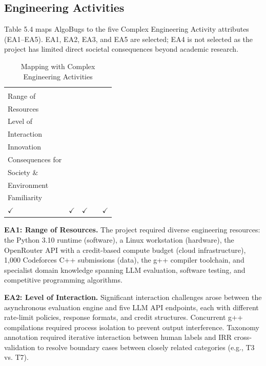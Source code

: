 \subsection{Engineering Activities}

Table 5.4 maps AlgoBugs to the five Complex Engineering Activity attributes (EA1--EA5). EA1, EA2, EA3, and EA5 are selected; EA4 is not selected as the project has limited direct societal consequences beyond academic research.

\begin{table}[h!]
    \centering
    \caption{Mapping with Complex Engineering Activities}
    \label{tab:ea_mapping}
    {\setlength{\tabcolsep}{3pt}\renewcommand{\arraystretch}{1.8}%
    \begin{tabularx}{\linewidth}{|>{\centering\arraybackslash}X|>{\centering\arraybackslash}X|>{\centering\arraybackslash}X|>{\centering\arraybackslash}X|>{\centering\arraybackslash}X|}
        \hline
        \makecell[c]{\textbf{EA1}\\\scriptsize Range of\\\scriptsize Resources} &
        \makecell[c]{\textbf{EA2}\\\scriptsize Level of\\\scriptsize Interaction} &
        \makecell[c]{\textbf{EA3}\\\scriptsize Innovation} &
        \makecell[c]{\textbf{EA4}\\\scriptsize Consequences for\\\scriptsize Society \&\\\scriptsize Environment} &
        \makecell[c]{\textbf{EA5}\\\scriptsize Familiarity} \\
        \hline
        $\checkmark$ & $\checkmark$ & $\checkmark$ & & $\checkmark$ \\
        \hline
    \end{tabularx}}
\end{table}

\textbf{EA1: Range of Resources.} The project required diverse engineering resources: the Python 3.10 runtime (software), a Linux workstation (hardware), the OpenRouter API with a credit-based compute budget (cloud infrastructure), 1,000 Codeforces C++ submissions (data), the g++ compiler toolchain, and specialist domain knowledge spanning LLM evaluation, software testing, and competitive programming algorithms.

\textbf{EA2: Level of Interaction.} Significant interaction challenges arose between the asynchronous evaluation engine and five LLM API endpoints, each with different rate-limit policies, response formats, and credit structures. Concurrent g++ compilations required process isolation to prevent output interference. Taxonomy annotation required iterative interaction between human labels and IRR cross-validation to resolve boundary cases between closely related categories (e.g., T3 vs. T7).

